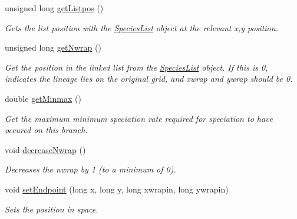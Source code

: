 \begin{DoxyCompactItemize}
\item 
unsigned long \hyperlink{class_datapoint_a7109db97fcbe6ab06950f2c651cf9b41}{get\+Listpos} ()
\begin{DoxyCompactList}\small\item\em Gets the list position with the \hyperlink{class_species_list}{Species\+List} object at the relevant x,y position. \end{DoxyCompactList}\item 
unsigned long \hyperlink{class_datapoint_a185ac830a665d9cad07e4ed3d15d71aa}{get\+Nwrap} ()
\begin{DoxyCompactList}\small\item\em Get the position in the linked list from the \hyperlink{class_species_list}{Species\+List} object. If this is 0, indicates the lineage lies on the original grid, and xwrap and ywrap should be 0. \end{DoxyCompactList}\item 
double \hyperlink{class_datapoint_a7b8c11d840f3267814304ec49ce5ac70}{get\+Minmax} ()
\begin{DoxyCompactList}\small\item\em Get the maximum minimum speciation rate required for speciation to have occured on this branch. \end{DoxyCompactList}\item 
void \hyperlink{class_datapoint_a21ea22f081195093473c96a20273ee24}{decrease\+Nwrap} ()\hypertarget{class_datapoint_a21ea22f081195093473c96a20273ee24}{}\label{class_datapoint_a21ea22f081195093473c96a20273ee24}

\begin{DoxyCompactList}\small\item\em Decreases the nwrap by 1 (to a minimum of 0). \end{DoxyCompactList}\item 
void \hyperlink{class_datapoint_a22596e6d3f3e75b1ccc4f1169cf3a2d1}{set\+Endpoint} (long x, long y, long xwrapin, long ywrapin)
\begin{DoxyCompactList}\small\item\em Sets the position in space. \end{DoxyCompactList}\end{DoxyCompactItemize}
